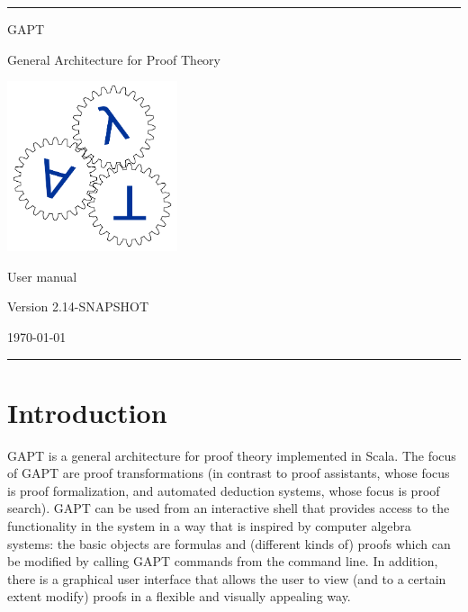\documentclass[a4paper,11pt]{book}
\begin{document}
\begin{titlepage}
\begin{center}

\hrule

\vspace*{20mm}

{\Huge GAPT}

\vspace*{5mm}

{\huge General Architecture for Proof Theory}

\vspace*{20mm}

\includegraphics[keepaspectratio,width=5cm]{logo}

\vspace*{20mm}

{\Huge User manual}

\vspace*{10mm}
{\Large Version 2.14-SNAPSHOT}
\vspace*{10mm}

{\Large \today}

\vspace*{20mm}

\hrule
\end{center}

\end{titlepage}

\listoffixmes

\setcounter{tocdepth}{1}
\tableofcontents

\chapter{Introduction}

GAPT is a general architecture for proof theory implemented in Scala.
The focus of GAPT are proof transformations (in contrast to proof assistants,
whose focus is proof formalization, and automated deduction systems, whose focus
is proof search).  GAPT can be used from an interactive shell that provides access to the functionality
in the system in a way that is inspired by computer algebra systems: the basic
objects are formulas and (different kinds of) proofs which can be modified
by calling GAPT commands from the command line. In addition, there
is a graphical user interface that allows the user to view (and to a certain
extent modify) proofs in a flexible and visually appealing way.
\end{document}
